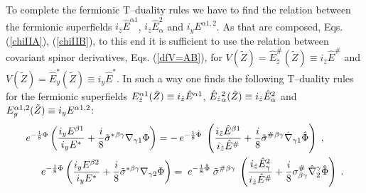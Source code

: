 \documentclass[a4paper,11pt]{article}
\begin{document}
To complete the fermionic T--duality rules we have to find 
the relation between the fermionic superfields 
$i_{\hat{z}}\hat{E}^{\alpha 1}$, $i_{\hat{z}}\hat{E}_{\alpha}^2$ 
and  $i_yE^{\alpha 1,2}$. As that are composed, 
Eqs.  (\ref{chiIIA}), (\ref{chiIIB}), 
to this end it is sufficient to use the relation 
between covariant spinor derivatives, 
Eqs. (\ref{dfV=AB}),  for $V(\tilde{Z})= 
\hat{E}^{\#}_{\hat{z}}(\tilde{Z}) \equiv i_{\hat{z}}\hat{E}^{\#}$ and 
$V(\tilde{Z})= \hat{E}_y^{*}(\tilde{Z})\equiv i_{y}\hat{E}^{*}$.
In such a way one finds 
the following T--duality rules 
for the fermionic superfields $E_{\hat{z}}^{{{\alpha}1}}(\tilde{Z})\equiv 
i_{\hat{z}}\hat{E}^{{{\alpha}1}}$, $
\hat{E}_{\hat{z}}{}^2_{{{\alpha}}}(\tilde{Z})\equiv 
i_{\hat{z}}\hat{E}^2_{ {{\alpha}}}$ and ${E}_y^{ {{\alpha}}1,2}(\tilde{Z})\equiv 
i_y{E}^{ {{\alpha}}1,2}$:
\begin{eqnarray}\label{Td-ch1}
e^{-{1\over 8}{\Phi}} 
\left({i_{y}{E}^{{\beta}1} \over i_yE^*}
+ {i \over 8} 
\tilde{\sigma}^{ {*}}{}^{ {\beta} {\gamma}}
{\nabla}_{ {\gamma}1}{\Phi}\right) 
= - \,  e^{-{1\over 8}\hat{\Phi}}\; 
\left(
{i_{\hat{z}}\hat{E}^{ {{\beta}1}}\over i_{\hat{z}}\hat{E}^{ {\#}}} 
+ {i \over 8} 
\tilde{\sigma}^{ {\#}}{}^{ {\beta} {\gamma}}
\hat{\nabla}_{ {\gamma}1}\hat{\Phi}\right) 
\; , \qquad \\  
\label{Td-ch2}
e^{-{1\over 8}{\Phi}} 
\left({i_y{E}^{ {\beta}2}\over i_yE^*} + {i \over 8} 
\tilde{\sigma}^{ {*} {\beta} {\gamma}}
{\nabla}_{ {\gamma}2}{\Phi}\right) = 
\; e^{- {1\over 8}\hat{\Phi}}\;  
\tilde{\sigma}^{ {\#} {\beta} {\gamma}}
\; \left( {i_{\hat{z}}\hat{E}_{ {\gamma}}^2 \over i_{\hat{z}}\hat{E}^{ {\#}}} 
+ {i \over 8}  
{\sigma}^{\#}_{ {\beta} {\gamma}}
\hat{\nabla}^{ {\gamma}}_2\hat{\Phi}\right) \; . 
\end{eqnarray}
\end{document}
